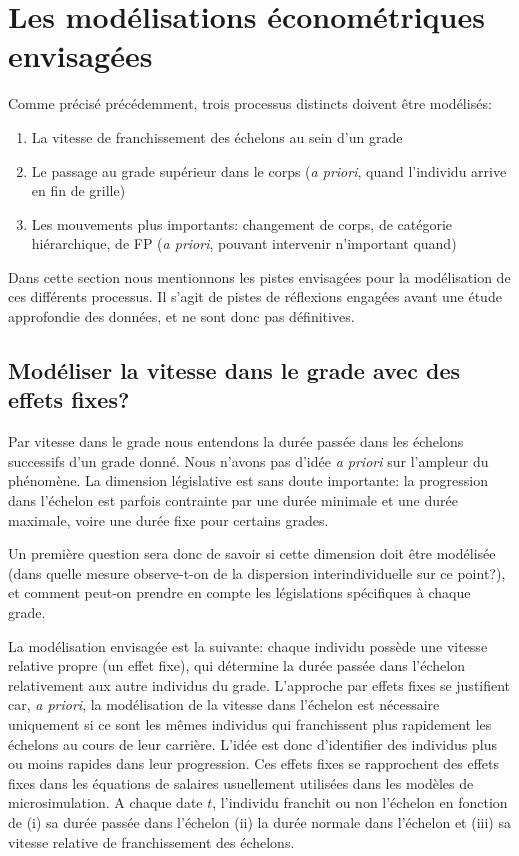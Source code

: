 \documentclass[11pt,a4paper]{article}
\begin{document}
\else \fi



\section{Les modélisations économétriques envisagées}

Comme précisé précédemment, trois processus distincts doivent être modélisés: 
\begin{enumerate}[leftmargin=1cm ,parsep=0cm,itemsep=0cm,topsep=0cm]
\item La vitesse de franchissement des échelons au sein d'un grade
\item Le passage au grade supérieur dans le corps (\textit{a priori}, quand l'individu arrive en fin de grille)
\item Les mouvements plus importants: changement de corps, de catégorie hiérarchique, de FP (\textit{a priori}, pouvant intervenir n'important quand)
\end{enumerate}

Dans cette section nous mentionnons les pistes envisagées pour la modélisation de ces différents processus. Il s'agit de pistes de réflexions engagées avant une étude approfondie des données, et ne sont donc pas définitives. 


\subsection{Modéliser la vitesse dans le grade avec des effets fixes?}

Par vitesse dans le grade nous entendons la durée passée dans les échelons successifs d'un grade donné. Nous n'avons pas d'idée \textit{a priori} sur l'ampleur du phénomène. La dimension législative est sans doute importante: la progression dans l'échelon est parfois contrainte par une durée minimale et une durée maximale, voire une durée fixe pour certains grades. 

Un première question sera donc de savoir si cette dimension doit être modélisée (dans quelle mesure observe-t-on de la dispersion interindividuelle sur ce point?), et comment peut-on prendre en compte les législations spécifiques à chaque grade. 

La modélisation envisagée est la suivante: chaque individu possède une vitesse relative propre (un effet fixe), qui détermine la durée passée dans l'échelon relativement aux autre individus du grade. L'approche par effets fixes se justifient car, \textit{a priori}, la modélisation de la vitesse dans l'échelon est nécessaire uniquement si ce sont les mêmes individus qui franchissent plus rapidement les échelons au cours de leur carrière. L'idée est donc d'identifier des individus plus ou moins \og rapides \fg{} dans leur progression. Ces effets fixes se rapprochent des effets fixes dans les équations de salaires usuellement utilisées dans les modèles de microsimulation.  
A chaque date $t$, l'individu franchit ou non l'échelon en fonction de (i) sa durée passée dans l'échelon (ii) la durée \og normale \fg{} dans l'échelon et (iii) sa vitesse relative de franchissement des échelons. 
\end{document}
